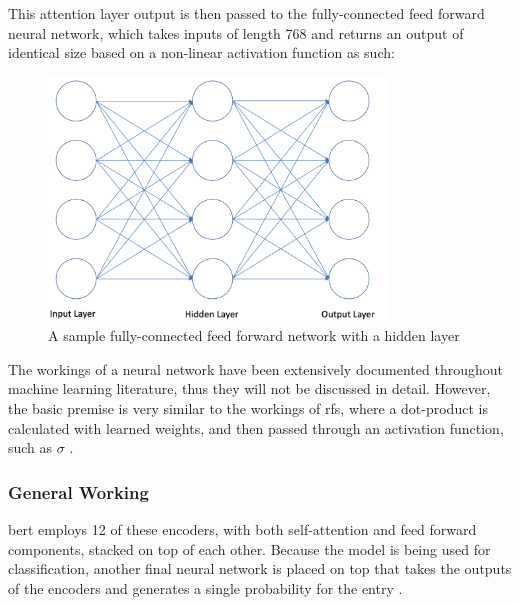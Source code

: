 This attention layer output is then passed to the fully-connected feed forward neural network, which takes inputs of length 768 and returns an output of identical size based on a non-linear activation function as such:

\begin{figure}[H]
\centering
\includegraphics[width=0.8\textwidth]{fig/full_neural.png}
\caption{A sample fully-connected feed forward network with a hidden layer}
\label{fig:neural-network}
\end{figure}

The workings of a neural network have been extensively documented throughout machine learning literature, thus they will not be discussed in detail. However, the basic premise is very similar to the workings of \acrshort{rfs}, where a dot-product is calculated with learned weights, and then passed through an activation function, such as $\sigma$ \parencite{lecun2015deep}.

\subsubsection{General Working}
\acrshort{bert} employs 12 of these encoders, with both self-attention and feed forward components, stacked on top of each other. Because the model is being used for classification, another final neural network is placed on top that takes the outputs of the encoders and generates a single probability for the entry \parencite{sun2019finetune}.